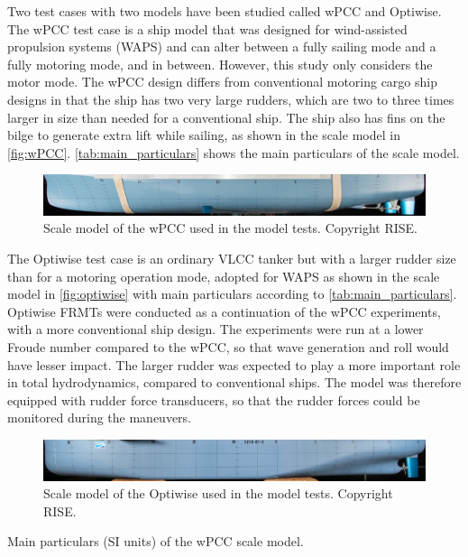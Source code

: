 \noindent Two test cases with two models have been studied called wPCC and Optiwise. The wPCC test case is a ship model that was designed for wind-assisted propulsion systems (WAPS) and can alter between a fully sailing mode and a fully motoring mode, and in between. 
However, this study only considers the motor mode. The wPCC design differs from conventional motoring cargo ship designs in that the ship has two very large rudders, which are two to three times larger in size than needed for a conventional ship. The ship also has fins on the bilge to generate extra lift while sailing, as shown in the scale model in \autoref{fig:wPCC}.
\autoref{tab:main_particulars} shows the main particulars of the scale model. 

\begin{figure}[h]
    \centering
    \includegraphics[width=\columnwidth]{figures/5m2.jpg}
    \caption{Scale model of the wPCC used in the model tests. Copyright RISE.}
    \label{fig:wPCC}
\end{figure}

The Optiwise test case is an ordinary VLCC tanker but with a larger rudder size than for a motoring operation mode, adopted for WAPS as shown in the scale model in \autoref{fig:optiwise} with main particulars according to \autoref{tab:main_particulars}.
Optiwise FRMTs were conducted as a continuation of the wPCC experiments, with a more conventional ship design. The experiments were run at a lower Froude number compared to the wPCC, so that wave generation and roll would have lesser impact. The larger rudder was expected to play a more important role in total hydrodynamics, compared to conventional ships. The model was therefore equipped with rudder force transducers, so that the rudder forces could be monitored during the maneuvers. 
\begin{figure}[h]
    \centering
    \includegraphics[width=\columnwidth]{figures/optiwise.jpg}
    \caption{Scale model of the Optiwise used in the model tests. Copyright RISE.}
    \label{fig:optiwise}
\end{figure}
\begin{table}[h]
    \centering
    \scriptsize
    \caption{Main particulars (SI units) of the wPCC scale model.}
    \label{tab:main_particulars}
\end{table}